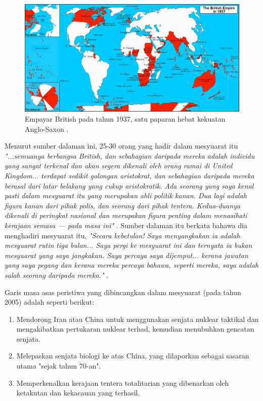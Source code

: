 \documentclass[10pt,twocolumn,letterpaper]{article}
\begin{document}
\begin{figure}[t]
\begin{center}
\includegraphics[width=1\textwidth]{british.jpg}
\end{center}
   \caption{Empayar British pada tahun 1937, satu paparan hebat kekuatan Anglo-Saxon \cite{14}.}
   \label{fig:2}
\end{figure}
Menurut sumber dalaman ini, 25-30 orang yang hadir dalam mesyuarat itu \textit{"...semuanya berbangsa British, dan sebahagian daripada mereka adalah individu yang sangat terkenal dan akan segera dikenali oleh orang ramai di United Kingdom... terdapat sedikit golongan aristokrat, dan sebahagian daripada mereka berasal dari latar belakang yang cukup aristokratik. Ada seorang yang saya kenal pasti dalam mesyuarat itu yang merupakan ahli politik kanan. Dua lagi adalah figura kanan dari pihak polis, dan seorang dari pihak tentera. Kedua-duanya dikenali di peringkat nasional dan merupakan figura penting dalam menasihati kerajaan semasa — pada masa ini"} \cite{4}. Sumber dalaman itu berkata bahawa dia menghadiri mesyuarat itu, \textit{"Secara kebetulan! Saya menyangkakan ia adalah mesyuarat rutin tiga bulan... Saya pergi ke mesyuarat ini dan ternyata ia bukan mesyuarat yang saya jangkakan. Saya percaya saya dijemput... kerana jawatan yang saya pegang dan kerana mereka percaya bahawa, seperti mereka, saya adalah salah seorang daripada mereka."} \cite{4}.

Garis masa asas peristiwa yang dibincangkan dalam mesyuarat (pada tahun 2005) adalah seperti berikut:

\begin{flushleft}
\begin{enumerate}
    \item Mendorong Iran atau China untuk menggunakan senjata nuklear taktikal dan mengakibatkan pertukaran nuklear terhad, kemudian menubuhkan gencatan senjata.
    \item Melepaskan senjata biologi ke atas China, yang dilaporkan sebagai sasaran utama "sejak tahun 70-an".
    \item Memperkenalkan kerajaan tentera totalitarian yang dibenarkan oleh ketakutan dan kekacauan yang terhasil.
\end{enumerate}
\end{flushleft}
\end{document}
